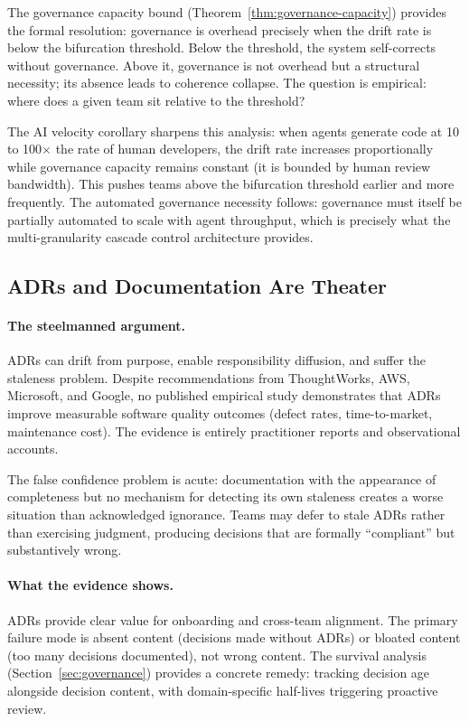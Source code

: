 \documentclass[11pt, a4paper]{googledeepmind}
\begin{document}
The governance capacity bound (Theorem~\ref{thm:governance-capacity}) provides the formal
resolution: governance is overhead precisely when the drift rate is below the
bifurcation threshold.  Below the threshold, the system self-corrects without
governance.  Above it, governance is not overhead but a structural necessity;
its absence leads to coherence collapse.  The question is empirical: where does
a given team sit relative to the threshold?

The AI velocity corollary sharpens this analysis: when agents generate code at
10 to 100$\times$ the rate of human developers, the drift rate increases
proportionally while governance capacity remains constant (it is bounded by
human review bandwidth).  This pushes teams above the bifurcation threshold
earlier and more frequently.  The automated governance necessity follows:
governance must itself be partially automated to scale with agent throughput,
which is precisely what the multi-granularity cascade control architecture
provides.


\subsection{ADRs and Documentation Are Theater}
\label{sec:contrarian-adrs}

\paragraph{The steelmanned argument.}
ADRs can drift from purpose, enable responsibility diffusion, and suffer the staleness problem. Despite recommendations from ThoughtWorks, AWS, Microsoft, and Google, no published empirical study demonstrates that ADRs improve measurable software quality outcomes (defect rates, time-to-market, maintenance cost). The evidence is entirely practitioner reports and observational accounts.

The false confidence problem is acute: documentation with the appearance of completeness but no mechanism for detecting its own staleness creates a worse situation than acknowledged ignorance. Teams may defer to stale ADRs rather than exercising judgment, producing decisions that are formally ``compliant'' but substantively wrong.

\paragraph{What the evidence shows.}
ADRs provide clear value for onboarding and cross-team alignment. The primary failure mode is absent content (decisions made without ADRs) or bloated content (too many decisions documented), not wrong content. The survival analysis (Section~\ref{sec:governance}) provides a concrete remedy: tracking decision age alongside decision content, with domain-specific half-lives triggering proactive review.
\end{document}
